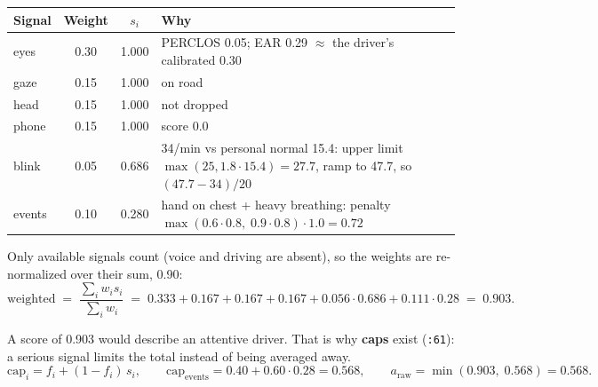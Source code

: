 \documentclass[11pt,a4paper]{article}
\newcommand{\fref}[2]{\texttt{\textcolor{s1}{\detokenize{#1}:#2}}}
\newcommand{\thead}[1]{\sffamily\bfseries\small #1}
\begin{document}
\begin{tabularx}{\textwidth}{@{}l c c Y@{}}
\toprule
\thead{Signal} & \thead{Weight} & \thead{$s_i$} & \thead{Why} \\
\midrule
eyes   & 0.30 & 1.000 & PERCLOS 0.05; EAR 0.29 $\approx$ the driver's calibrated 0.30 \\
gaze   & 0.15 & 1.000 & on road \\
head   & 0.15 & 1.000 & not dropped \\
phone  & 0.15 & 1.000 & score 0.0 \\
blink  & 0.05 & 0.686 & 34/min vs personal normal 15.4: upper limit $\max(25, 1.8\cdot15.4)=27.7$, ramp to 47.7, so $(47.7-34)/20$ \\
events & 0.10 & 0.280 & hand on chest + heavy breathing: penalty $\max(0.6\cdot0.8,\;0.9\cdot0.8)\cdot1.0 = 0.72$ \\
\bottomrule
\end{tabularx}

Only available signals count (voice and driving are absent), so the weights are re-normalized over
their sum, 0.90:
\[
\text{weighted} \;=\; \frac{\sum_i w_i s_i}{\sum_i w_i}
 \;=\; 0.333 + 0.167 + 0.167 + 0.167 + 0.056\cdot0.686 + 0.111\cdot0.28 \;=\; 0.903 .
\]

A score of 0.903 would describe an attentive driver. That is why \textbf{caps} exist
(\fref{fusion.py}{61}): a serious signal limits the total instead of being averaged away.
\[
\text{cap}_i = f_i + (1-f_i)\,s_i ,\qquad
\text{cap}_\text{events} = 0.40 + 0.60\cdot0.28 = 0.568 ,\qquad
a_\text{raw} = \min(0.903,\;0.568) = 0.568 .
\]

\begin{center}
\end{center}
\end{document}
